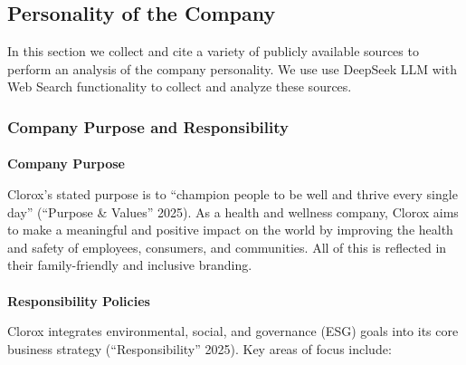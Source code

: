\documentclass[
  letterpaper,
  DIV=11,
  numbers=noendperiod]{scrartcl}
\makeatletter
\let\oldparagraph\paragraph
\renewcommand{\paragraph}{
    \@ifstar
      \xxxParagraphStar
      \xxxParagraphNoStar
  }
\newcommand{\xxxParagraphStar}[1]{\oldparagraph*{#1}\mbox{}}
\newcommand{\xxxParagraphNoStar}[1]{\oldparagraph{#1}\mbox{}}
\makeatother
\begin{document}
\subsection{Personality of the
Company}\label{personality-of-the-company}

\begin{tcolorbox}[enhanced jigsaw, left=2mm, colback=white, opacityback=0, coltitle=black, arc=.35mm, leftrule=.75mm, bottomrule=.15mm, colbacktitle=quarto-callout-note-color!10!white, toptitle=1mm, title=\textcolor{quarto-callout-note-color}{\faInfo}\hspace{0.5em}{Note}, opacitybacktitle=0.6, bottomtitle=1mm, titlerule=0mm, breakable, rightrule=.15mm, toprule=.15mm, colframe=quarto-callout-note-color-frame]

In this section we collect and cite a variety of publicly available
sources to perform an analysis of the company personality. We use use
DeepSeek LLM with Web Search functionality to collect and analyze these
sources.

\end{tcolorbox}

\subsubsection{\texorpdfstring{\textbf{Company Purpose and
Responsibility}}{Company Purpose and Responsibility}}\label{company-purpose-and-responsibility}

\paragraph{\texorpdfstring{\textbf{Company
Purpose}}{Company Purpose}}\label{company-purpose}

Clorox's stated purpose is to ``champion people to be well and thrive
every single day'' ({``Purpose \& {Values}''} 2025). As a health and
wellness company, Clorox aims to make a meaningful and positive impact
on the world by improving the health and safety of employees, consumers,
and communities. All of this is reflected in their family-friendly and
inclusive branding.

\paragraph{\texorpdfstring{\textbf{Responsibility
Policies}}{Responsibility Policies}}\label{responsibility-policies}

Clorox integrates environmental, social, and governance (ESG) goals into
its core business strategy ({``Responsibility''} 2025). Key areas of
focus include:
\end{document}
